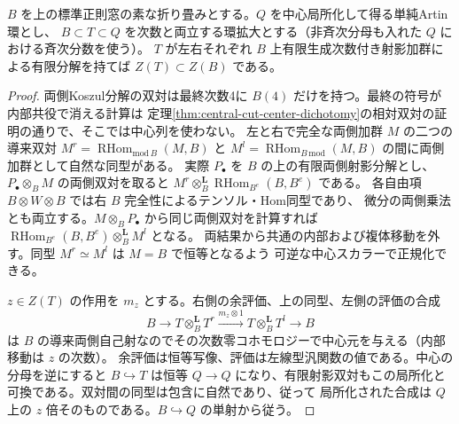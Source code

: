 \begin{lemma}\label{lem:cy-finite-birational-transfer}
$B$ を上の標準正則窓の素な折り畳みとする。$Q$ を中心局所化して得る単純Artin環とし、
$B\subset T\subset Q$ を次数と両立する環拡大とする（非斉次分母も入れた $Q$ における斉次分数を使う）。
$T$ が左右それぞれ $B$ 上有限生成次数付き射影加群による有限分解を持てば $Z(T)\subset Z(B)$ である。
\end{lemma}
\begin{proof}
両側Koszul分解の双対は最終次数4に $B(4)$ だけを持つ。最終の符号が内部共役で消える計算は
定理\ref{thm:central-cut-center-dichotomy}の相対双対の証明の通りで、そこでは中心列を使わない。
左と右で完全な両側加群 $M$ の二つの導来双対 $M^r=\operatorname{RHom}_{\mathrm{mod}\,B}(M,B)$ と
$M^l=\operatorname{RHom}_{B\,\mathrm{mod}}(M,B)$ の間に両側加群として自然な同型がある。
実際 $P_\bullet$ を $B$ の上の有限両側射影分解とし、$P_\bullet\otimes_B M$ の両側双対を取ると
$M^r\otimes_B^{\mathbf L}\operatorname{RHom}_{B^e}(B,B^e)$ である。
各自由項 $B\otimes W\otimes B$ では右 $B$ 完全性によるテンソル・Hom同型であり、
微分の両側乗法とも両立する。$M\otimes_B P_\bullet$ から同じ両側双対を計算すれば
$\operatorname{RHom}_{B^e}(B,B^e)\otimes_B^{\mathbf L} M^l$ となる。
両結果から共通の内部および複体移動を外す。同型 $M^r\simeq M^l$ は $M=B$ で恒等となるよう
可逆な中心スカラーで正規化できる。

$z\in Z(T)$ の作用を $m_z$ とする。右側の余評価、上の同型、左側の評価の合成
\[
 B\longrightarrow T\otimes_B^{\mathbf L} T^r
 \xrightarrow{m_z\otimes 1} T\otimes_B^{\mathbf L} T^l\longrightarrow B
\]
は $B$ の導来両側自己射なのでその次数零コホモロジーで中心元を与える（内部移動は $z$ の次数）。
余評価は恒等写像、評価は左線型汎関数の値である。中心の分母を逆にすると $B\hookrightarrow T$ は恒等
$Q\to Q$ になり、有限射影双対もこの局所化と可換である。双対間の同型は包含に自然であり、従って
局所化された合成は $Q$ 上の $z$ 倍そのものである。$B\hookrightarrow Q$ の単射から従う。
\end{proof}

